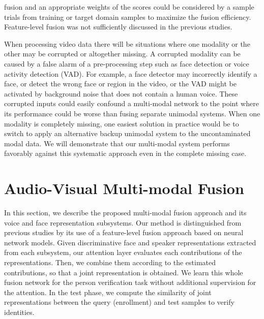 \documentclass{article}
\newcommand{\sscm}[1]{\textcolor{blue}{[#1 --SS]}}
\newcommand{\ohcm}[1]{\textcolor{red}{Oh$>$ #1 --}}
\begin{document}
fusion and an appropriate weights of the scores could be considered by a sample trials from training or target domain samples to maximize the fusion efficiency. Feature-level fusion was not sufficiently discussed in the previous studies. %

When processing video data there will be situations where one modality or the other may be corrupted or altogether missing.  A corrupted modality can be caused by a false alarm of a pre-processing step such as face detection or voice activity detection (VAD).  For example, a face detector may incorrectly identify a face, or detect the wrong face or region in the video, or the VAD might be activated by background noise that does not contain a human voice. These corrupted inputs could easily confound a multi-modal network to the point where its performance could be worse than fusing separate unimodal systems.  
When one modality is completely missing, 
one easiest solution in practice would be to switch to apply an alternative backup unimodal system to the uncontaminated modal data.
We will demonstrate that our multi-modal system performs favorably against this systematic approach even in the complete missing case.

\section{Audio-Visual Multi-modal Fusion}
In this section, we describe the proposed multi-modal fusion approach and its voice and face representation subsystems.
Our method is distinguished from previous studies by its use of a feature-level fusion approach based on neural network models. 
Given discriminative face and speaker representations extracted from each subsystem, our attention layer evaluates each contributions of the  representations.
Then, we combine them according to the estimated contributions, so that a joint representation is obtained.
We learn this whole fusion network for the person verification task without additional supervision for the attention.
In the test phase, we compute the similarity of joint representations between the query (enrollment) and test samples to verify identities.
\end{document}
